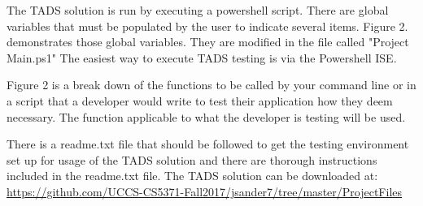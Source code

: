 The TADS solution is run by executing a powershell script.  There are global variables that must be populated by the user to indicate several items.  Figure 2. demonstrates those global variables.  They are modified in the file called "Project Main.ps1"  The easiest way to execute TADS testing is via the Powershell ISE. 

Figure 2 is a break down of the functions to be called by your command line or in a script that a developer would write to test their application how they deem necessary.  The function applicable to what the developer is testing will be used.    

There is a readme.txt file that should be followed to get the testing environment set up for usage of the TADS solution and there are thorough instructions included in the readme.txt file.  The TADS solution can be downloaded at: \url{https://github.com/UCCS-CS5371-Fall2017/jsander7/tree/master/ProjectFiles} \\


